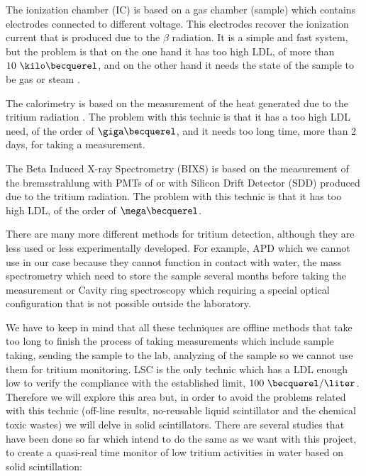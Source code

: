 The ionization chamber (IC) is based on a gas chamber (sample) which contains electrodes connected to different voltage. This electrodes recover the ionization current that is produced due to the $\beta$ radiation. It is a simple and fast system, but the problem is that on the one hand it has too high LDL, of more than $ 10~\kilo\becquerel$, and on the other hand it needs the state of the sample to be gas or steam \cite{IonizationChamber1} \cite{IonizationChamber2}.

The calorimetry is based on the measurement of the heat generated due to the tritium radiation \cite{Calorimeter1} \cite{Calorimeter2}. The problem with this technic is that it has a too high LDL need, of the order of $\giga\becquerel$, and it needs too long time, more than 2 days, for taking a measurement.

The Beta Induced X-ray Spectrometry (BIXS) is based on the measurement of the bremsstrahlung with PMTs of  \cite{XRays1} \cite{XRays2} or with Silicon Drift Detector (SDD) \cite{Bremstrahlung} produced due to the tritium radiation. The problem with this technic is that it has too high LDL, of the order of $\mega\becquerel$.

There are many more different methods for tritium detection, although they are less used or less experimentally developed. For example,  APD \cite{APD} which we cannot use in our case because they cannot function in contact with water, the mass spectrometry which need to store the sample several months before taking the measurement \cite{Spectrometry} or Cavity ring spectroscopy \cite{Ring} which requiring a special optical configuration that is not possible outside the laboratory.

We have to keep in mind that all these techniques are offline methods that take too long to finish the process of taking measurements which include sample taking, sending the sample to the lab, analyzing of the sample so we cannot use them for tritium monitoring. LSC is the only technic which has a LDL enough low to verify the compliance with the established limit, $100~\becquerel/\liter$. Therefore we will explore this area but, in order to avoid the problems related with this technic (off-line results, no-reusable liquid scintillator and the chemical toxic wastes) we will delve in solid scintillators. There are several studies that have been done so far which intend to do the same as we want with this project, to create a quasi-real time monitor of low tritium activities in water based on solid scintillation:

